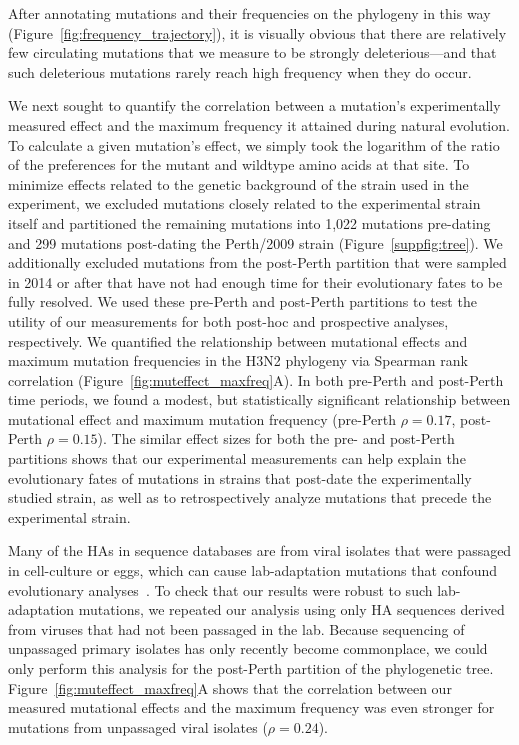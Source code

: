 \documentclass[9pt,twocolumn,twoside]{pnas-new}
\begin{document}
After annotating mutations and their frequencies on the phylogeny in this way (Figure~\ref{fig:frequency_trajectory}), it is visually obvious that there are relatively few circulating mutations that we measure to be strongly deleterious---and that such deleterious mutations rarely reach high frequency when they do occur.

We next sought to quantify the correlation between a mutation's experimentally measured effect and the maximum frequency it attained during natural evolution.
To calculate a given mutation's effect, we simply took the logarithm of the ratio of the preferences for the mutant and wildtype amino acids at that site.
To minimize effects related to the genetic background of the strain used in the experiment, we excluded mutations closely related to the experimental strain itself and partitioned the remaining mutations into 1,022 mutations pre-dating and 299 mutations post-dating the Perth/2009 strain (Figure~\ref{suppfig:tree}).
We additionally excluded mutations from the post-Perth partition that were sampled in 2014 or after that have not had enough time for their evolutionary fates to be fully resolved.
We used these pre-Perth and post-Perth partitions to test the utility of our measurements for both post-hoc and prospective analyses, respectively.
We quantified the relationship between mutational effects and maximum mutation frequencies in the H3N2 phylogeny via Spearman rank correlation (Figure~\ref{fig:muteffect_maxfreq}A).
In both pre-Perth and post-Perth time periods, we found a modest, but statistically significant relationship between mutational effect and maximum mutation frequency (pre-Perth $\rho = 0.17$, post-Perth $\rho = 0.15$). 
The similar effect sizes for both the pre- and post-Perth partitions shows that our experimental measurements can help explain the evolutionary fates of mutations in strains that post-date the experimentally studied strain, as well as to retrospectively analyze mutations that precede the experimental strain. 

Many of the HAs in sequence databases are from viral isolates that were passaged in cell-culture or eggs, which can cause lab-adaptation mutations that confound evolutionary analyses~\cite{mcwhite2016sequence}.
To check that our results were robust to such lab-adaptation mutations, we repeated our analysis using only HA sequences derived from viruses that had not been passaged in the lab.
Because sequencing of unpassaged primary isolates has only recently become commonplace, we could only perform this analysis for the post-Perth partition of the phylogenetic tree.
Figure~\ref{fig:muteffect_maxfreq}A shows that the correlation between our measured mutational effects and the maximum frequency was even stronger for mutations from unpassaged viral isolates ($\rho = 0.24$).
\end{document}
